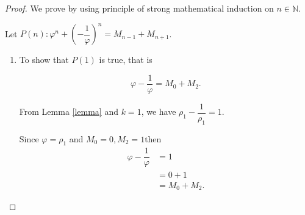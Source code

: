 \documentclass{rmutt-seminar}
\begin{document}
\begin{proof} We prove by using principle of strong  mathematical induction on $n \in \mathbb{N}$. 

\quad Let $P(n):\varphi^n + \left(-\dfrac{1}{\varphi}\right)^n = M_{n-1} + M_{n+1}$. 
\begin{enumerate}[label=(\roman*),leftmargin = 1.5cm]
	\item To show  that $P(1)$ is true, that is

 $$\varphi - \dfrac{1}{\varphi} = M_{0} + M_{2}.$$ 
 
 From Lemma \ref{lemma} and $k=1$, we have $\rho_1 - \dfrac{1}{\rho_1} =1 $.
 
 Since $ \varphi = \rho_1$ and $M_0=0, M_2=1 $then 
  \begin{align*}
 	\varphi - \dfrac{1}{\varphi} &= 1\\
 	&= 0 + 1\\
 	&= M_{0} + M_{2}.
 \end{align*}
 
 

\end{enumerate}
\end{proof}
\end{document}
